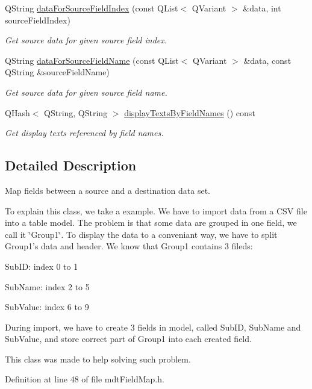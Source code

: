 \begin{DoxyCompactItemize}
QString \hyperlink{classmdt_field_map_aea457e5e7a7ea43f80c963a03fccd4d3}{dataForSourceFieldIndex} (const QList$<$ QVariant $>$ \&data, int sourceFieldIndex)
\begin{DoxyCompactList}\small\item\em Get source data for given source field index. \end{DoxyCompactList}\item 
QString \hyperlink{classmdt_field_map_a76e6ebfa8cd611b36e3a3c2e8e0d58da}{dataForSourceFieldName} (const QList$<$ QVariant $>$ \&data, const QString \&sourceFieldName)
\begin{DoxyCompactList}\small\item\em Get source data for given source field name. \end{DoxyCompactList}\item 
QHash$<$ QString, QString $>$ \hyperlink{classmdt_field_map_ad772f68130bd2e535f598b1d091a7b53}{displayTextsByFieldNames} () const 
\begin{DoxyCompactList}\small\item\em Get display texts referenced by field names. \end{DoxyCompactList}\end{DoxyCompactItemize}


\subsection{Detailed Description}
Map fields between a source and a destination data set. 

To explain this class, we take a example. We have to import data from a CSV file into a table model. The problem is that some data are grouped in one field, we call it \char`\"{}Group1\char`\"{}. To display the data to a conveniant way, we have to split Group1's data and header. We know that Group1 contains 3 fileds:
\begin{DoxyItemize}
\item SubID: index 0 to 1
\item SubName: index 2 to 5
\item SubValue: index 6 to 9
\end{DoxyItemize}

During import, we have to create 3 fields in model, called SubID, SubName and SubValue, and store correct part of Group1 into each created field.

This class was made to help solving such problem. 

Definition at line 48 of file mdtFieldMap.h.



